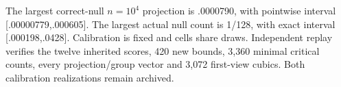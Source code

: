The largest correct-null $n=10^4$ projection is .0000790, with pointwise
interval [.00000779,.000605]. The largest actual null count is 1/128,
with exact interval [.000198,.0428]. Calibration is fixed and cells share
draws. Independent replay verifies the twelve inherited scores, 420 new bounds,
3,360 minimal critical counts, every projection/group vector and 3,072
first-view cubics. Both calibration realizations remain archived.
